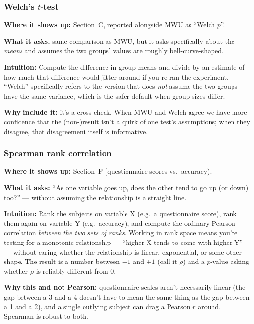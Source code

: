 \documentclass[11pt]{article}
\begin{document}
\subsubsection*{Welch's $t$-test}

\textbf{Where it shows up:} Section~C, reported alongside MWU as ``Welch $p$''.

\textbf{What it asks:} same comparison as MWU, but it asks specifically about the \emph{means} and assumes the two groups' values are roughly bell-curve-shaped.

\textbf{Intuition:} Compute the difference in group means and divide by an estimate of how much that difference would jitter around if you re-ran the experiment. ``Welch'' specifically refers to the version that does \emph{not} assume the two groups have the same variance, which is the safer default when group sizes differ.

\textbf{Why include it:} it's a cross-check. When MWU and Welch agree we have more confidence that the (non-)result isn't a quirk of one test's assumptions; when they disagree, that disagreement itself is informative.

\subsubsection*{Spearman rank correlation}

\textbf{Where it shows up:} Section~F (questionnaire scores vs.\ accuracy).

\textbf{What it asks:} ``As one variable goes up, does the other tend to go up (or down) too?'' --- without assuming the relationship is a straight line.

\textbf{Intuition:} Rank the subjects on variable X (e.g.\ a questionnaire score), rank them again on variable Y (e.g.\ accuracy), and compute the ordinary Pearson correlation \emph{between the two sets of ranks}. Working in rank space means you're testing for a monotonic relationship --- ``higher X tends to come with higher Y'' --- without caring whether the relationship is linear, exponential, or some other shape. The result is a number between $-1$ and $+1$ (call it $\rho$) and a $p$-value asking whether $\rho$ is reliably different from $0$.

\textbf{Why this and not Pearson:} questionnaire scales aren't necessarily linear (the gap between a 3 and a 4 doesn't have to mean the same thing as the gap between a 1 and a 2), and a single outlying subject can drag a Pearson $r$ around. Spearman is robust to both.
\end{document}
